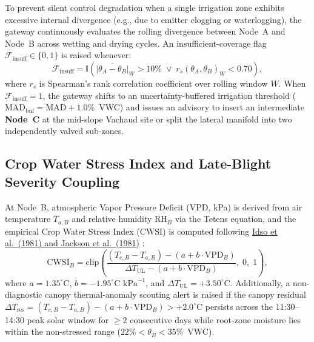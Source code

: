 \documentclass[10pt,twocolumn,a4paper]{article}
\begin{document}
To prevent silent control degradation when a single irrigation zone exhibits excessive internal divergence (e.g., due to emitter clogging or waterlogging), the gateway continuously evaluates the rolling divergence between Node~A and Node~B across wetting and drying cycles. An insufficient-coverage flag $\mathcal{F}_{\text{insuff}} \in \{0,1\}$ is raised whenever:
\begin{equation}
  \mathcal{F}_{\text{insuff}} = \mathbb{I}\!\left(\overline{|\theta_A - \theta_B|}_{W} > 10\% \;\lor\; r_s(\theta_A, \theta_B)_{W} < 0.70\right),
  \label{eq:sufficiency}
\end{equation}
where $r_s$ is Spearman's rank correlation coefficient over rolling window $W$. When $\mathcal{F}_{\text{insuff}} = 1$, the gateway shifts to an uncertainty-buffered irrigation threshold ($\mathrm{MAD}_{\text{buf}} = \mathrm{MAD} + 1.0\%$~VWC) and issues an advisory to insert an intermediate \textbf{Node~C} at the mid-slope Vachaud site or split the lateral manifold into two independently valved sub-zones.

\subsection{Crop Water Stress Index and Late-Blight Severity Coupling}

At Node~B, atmospheric Vapor Pressure Deficit ($\mathrm{VPD}$, kPa) is derived from air temperature $T_{a,B}$ and relative humidity $\mathrm{RH}_B$ via the Tetens equation, and the empirical Crop Water Stress Index ($\mathrm{CWSI}$) is computed following \href{https://www.ars.usda.gov/ARSUserFiles/30100000/1990-1999documents/266%201992%20GardnerJPA.pdf}{Idso et al.\ (1981) and Jackson et al.\ (1981)} \cite{idso1981_usda,scielo_cwsi}:
\begin{equation}
  \mathrm{CWSI}_B = \mathrm{clip}\!\left(\frac{(T_{c,B} - T_{a,B}) - (a + b\cdot\mathrm{VPD}_B)}{\Delta T_{\mathrm{UL}} - (a + b\cdot\mathrm{VPD}_B)},\; 0,\; 1\right),
  \label{eq:cwsi}
\end{equation}
where $a = 1.35^\circ\text{C}$, $b = -1.95^\circ\text{C kPa}^{-1}$, and $\Delta T_{\mathrm{UL}} = +3.50^\circ\text{C}$. Additionally, a non-diagnostic canopy thermal-anomaly scouting alert is raised if the canopy residual $\Delta T_{\text{res}} = (T_{c,B} - T_{a,B}) - (a + b\cdot\mathrm{VPD}_B) > +2.0^\circ\text{C}$ persists across the 11:30--14:30 peak solar window for $\ge 2$ consecutive days while root-zone moisture lies within the non-stressed range ($22\% < \theta_B < 35\%$~VWC).
\end{document}
